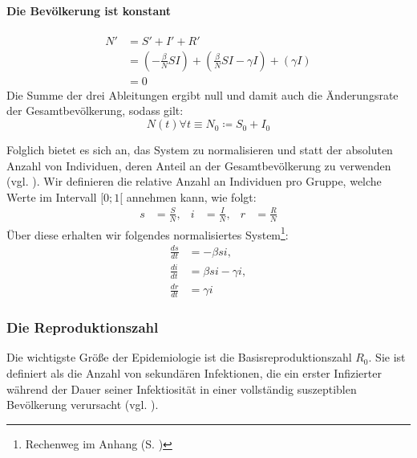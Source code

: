\documentclass[../main.tex]{subfiles}
\begin{document}
    \paragraph{Die Bevölkerung ist konstant}
    \begin{equation*}
        \begin{split}
            N' & = S' + I' + R' \\
               & = (- \frac{\beta}{N} S I) + (\frac{\beta}{N} S I - \gamma I) + (\gamma I) \\
               & = 0
        \end{split}
    \end{equation*}
    Die Summe der drei Ableitungen ergibt null und damit auch die Änderungsrate der Gesamtbevölkerung, sodass gilt:
    \begin{equation}
        N(t) \forall t \equiv N_0 \coloneqq S_0 + I_0
    \end{equation}

    Folglich bietet es sich an, das System zu normalisieren und statt der absoluten Anzahl von Individuen, deren Anteil an der Gesamtbevölkerung zu verwenden (vgl. \cite[S. 90]{Bri03}). Wir definieren die relative Anzahl an Individuen pro Gruppe, welche Werte im Intervall $[0;1[$ annehmen kann, wie folgt:
    \begin{equation}
        \label{eq:proportions}
        \begin{aligned}
            s &= \frac{S}{N}, & i &= \frac{I}{N}, & r &= \frac{R}{N}
        \end{aligned}
    \end{equation}
    Über diese erhalten wir folgendes normalisiertes System\footnote{Rechenweg im Anhang (S. \pageref{ap:normalization})}:
    \begin{equation}
        \label{eq:sir_norm}
        \begin{aligned}
          \frac{ds}{dt} &= - \beta s i, \\
          \frac{di}{dt} &= \beta s i - \gamma i, \\
          \frac{dr}{dt} &= \gamma i
        \end{aligned}
    \end{equation}


        \subsubsection{Die Reproduktionszahl}
        \label{sssec:reproduction_number}
        Die wichtigste Größe der Epidemiologie ist die Basisreproduktionszahl $R_0$. Sie ist definiert als die Anzahl von sekundären Infektionen, die ein erster Infizierter während der Dauer seiner Infektiosität in einer vollständig suszeptiblen Bevölkerung verursacht (vgl. \cite[S. 161]{DHB13}).
\end{document}
